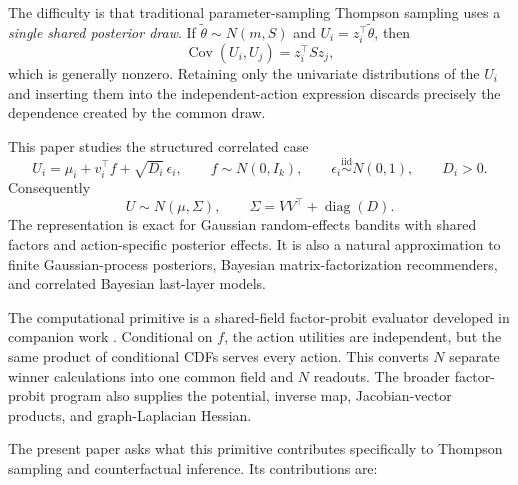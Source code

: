\documentclass[11pt]{article}
\begin{document}
The difficulty is that traditional parameter-sampling Thompson sampling uses a \emph{single shared posterior draw}. If $\widetilde\theta \sim N(m, S)$ and $U_i = z_i^\top \widetilde\theta$, then
\[
\operatorname{Cov}(U_i, U_j) = z_i^\top S z_j,
\]
which is generally nonzero. Retaining only the univariate distributions of the $U_i$ and inserting them into the independent-action expression discards precisely the dependence created by the common draw.

This paper studies the structured correlated case
\begin{equation}
\label{eq:factor}
U_i = \mu_i + v_i^\top f + \sqrt{D_i}\,\epsilon_i,
\qquad
f \sim N(0, I_k),
\qquad
\epsilon_i \stackrel{\mathrm{iid}}{\sim} N(0,1),
\qquad
D_i > 0.
\end{equation}
Consequently
\[
U \sim N(\mu, \Sigma),
\qquad
\Sigma = V V^\top + \operatorname{diag}(D).
\]
The representation is exact for Gaussian random-effects bandits with shared factors and action-specific posterior effects. It is also a natural approximation to finite Gaussian-process posteriors, Bayesian matrix-factorization recommenders, and correlated Bayesian last-layer models.

The computational primitive is a shared-field factor-probit evaluator developed in companion work \parencite{cotton2026probit}. Conditional on $f$, the action utilities are independent, but the same product of conditional CDFs serves every action. This converts $N$ separate winner calculations into one common field and $N$ readouts. The broader factor-probit program also supplies the potential, inverse map, Jacobian-vector products, and graph-Laplacian Hessian.

The present paper asks what this primitive contributes specifically to Thompson sampling and counterfactual inference. Its contributions are:
\end{document}
